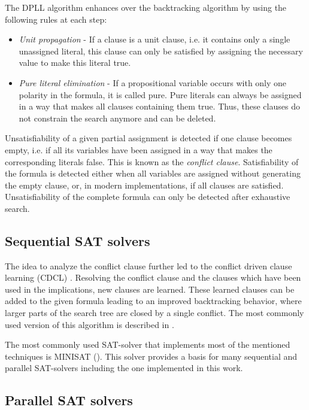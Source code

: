 The DPLL algorithm enhances over the backtracking algorithm by using the following rules at each step:
\begin{itemize}
\item \textit{Unit propagation} - If a clause is a unit clause, i.e. it contains only a single unassigned literal, this clause can only be satisfied by assigning the necessary value to make this literal true.

\item \textit{Pure literal elimination} - If a propositional variable occurs with only one polarity in the formula, it is called pure. Pure literals can always be assigned in a way that makes all clauses containing them true. Thus, these clauses do not constrain the search anymore and can be deleted.
\end{itemize}

Unsatisfiability of a given partial assignment is detected if one clause becomes empty, i.e. if all its variables have been assigned in a way that makes the corresponding literals false. This is known as the \textit{conflict clause}. Satisfiability of the formula is detected either when all variables are assigned without generating the empty clause, or, in modern implementations, if all clauses are satisfied. Unsatisfiability of the complete formula can only be detected after exhaustive search.

\subsection{Sequential SAT solvers}
The idea to analyze the conflict clause further led
to the conflict driven clause learning (CDCL) \cite{GRASP}. Resolving the conflict clause and the
clauses which have been used in the implications, new
clauses are learned. These learned clauses can be added
to the given formula leading to an improved backtracking
behavior, where larger parts of the search tree are
closed by a single conflict. The most commonly used
version of this algorithm is described in \cite{cdcl}.

The most commonly used SAT-solver that implements
most of the mentioned techniques is MINISAT (\cite{minisat}). This solver provides a basis for many sequential and parallel SAT-solvers including the one implemented in this work.

\subsection{Parallel SAT solvers}

